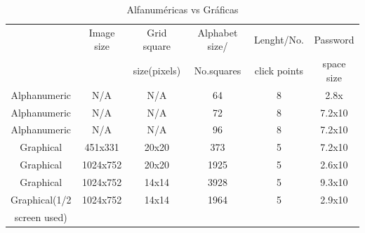 \documentclass[12pt]{report}
\begin{document}
\begin{table}[h!]
	\centering
	\begin{tabular}{|c|c|c|c|c|c|}
		\hline
				 	 
		         		 & Image size &   Grid square &	Alphabet size/ &Lenght/No.  & Password \\ 
		                &           &  size(pixels)  & No.squares& click points & space size \\ \hline
		Alphanumeric    & N/A       & N/A     & 64   & 8  & 2.8x \\ \hline
		Alphanumeric    & N/A       & N/A     & 72   & 8  & 7.2x10 \\ \hline
		Alphanumeric    & N/A       & N/A     & 96   & 8  & 7.2x10 \\ \hline
		Graphical        & 451x331   & 20x20   & 373  & 5  &7.2x10 \\ \hline
		Graphical        & 1024x752  & 20x20   & 1925 & 5  &2.6x10 \\ \hline
		Graphical        & 1024x752  & 14x14   & 3928 & 5  &9.3x10 \\ \hline
		Graphical(1/2   & 1024x752  & 14x14   & 1964 & 5  & 2.9x10 \\ 
		screen used)   &   &    &  &  &  \\ \hline
	\end{tabular}
	\caption{Alfanuméricas vs Gráficas}
	\label{tabla:Alfanuméricas vs Gráficashhh}
\end{table}


	

	
	
	
	
\end{document}
